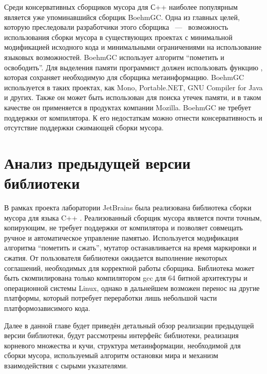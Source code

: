 Среди консервативных сборщиков мусора для С++ наиболее популярным является уже 
упоминавшийся сборщик BoehmGC. 
Одна из главных целей, которую преследовали разработчики этого сборщика ~---~ 
возможность использования сборки мусора в существующих проектах с минимальной 
модификацией исходного кода и минимальными ограничениями на использование языковых 
возможностей. 
BoehmGC использует алгоритм ``пометить и освободить''. 
Для выделения памяти программист должен использовать функцию , 
которая сохраняет необходимую для сборщика метаинформацию. 
BoehmGC используется в таких проектах, как Mono, Portable.NET, 
GNU Compiler for Java и других. 
Также он может быть использован для поиска утечек памяти, и в таком качестве он 
применяется в продуктах компании Mozilla. 
BoehmGC не требует поддержки от компилятора. 
К его недостаткам можно отнести консервативность и отсутствие поддержки сжимающей 
сборки мусора.


\section{Анализ предыдущей версии библиотеки}
\label{sec:old_lib}

В рамках проекта лаборатории JetBrains была реализована библиотека сборки мусора для 
языка C++ \cite{book:precisegc_berezun,book:precisegc_samofalov,book:precisegc_secr}. 
Реализованный сборщик мусора является почти точным, копирующим, не требует поддержки 
от компилятора и позволяет совмещать ручное и автоматическое управление памятью. 
Используется модификация алгоритма ``пометить и сжать'', 
мутатор останавливается на время маркировки и сжатия. 
От пользователя библиотеки ожидается выполнение некоторых соглашений, необходимых для 
корректной работы сборщика. 
Библиотека может быть скомпилирована только компилятором gcc для 64 битной архитектуры 
и операционной системы Linux, однако в дальнейшем возможен перенос на другие платформы, 
который потребует переработки лишь небольшой части платформозависимого кода.

Далее в данной главе будет приведён детальный обзор реализации предыдущей версии 
библиотеки, будут рассмотрены интерфейс библиотеки, реализация корневого множества и 
кучи, структура метаинформации, необходимой для сборки мусора, используемый алгоритм 
остановки мира и механизм взаимодействия с сырыми указателями.

